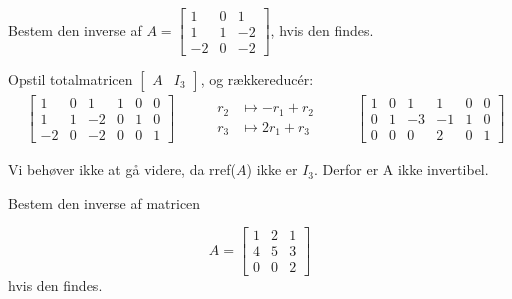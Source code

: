 \begin{example}
    Bestem den inverse af $A=\left[\begin{array}{rrr}1 & 0 & 1 \\ 1 & 1 & -2 \\ -2 & 0 & -2\end{array}\right]$, hvis den findes.
\end{example}

\begin{solution}
    Opstil totalmatricen $\left[\begin{array}{ll}A & I_3\end{array}\right]$, og rækkereducér:
\[
\begin{alignedat}{3}
& \left[\begin{array}{cccccc}
1 & 0 & 1 & 1 & 0 & 0 \\
1 & 1 & -2 & 0 & 1 & 0 \\
-2 & 0 & -2 & 0 & 0 & 1
\end{array}\right]
& \quad & \begin{aligned}
    r_2 &\mapsto -r_1 + r_2 \\
    r_3 &\mapsto 2 r_1 + r_3
\end{aligned}
& \quad & \left[\begin{array}{cccccc}
1 & 0 & 1 & 1 & 0 & 0 \\
0 & 1 & -3 & -1 & 1 & 0 \\
0 & 0 & 0 & 2 & 0 & 1
\end{array}\right]
\end{alignedat}
\]

Vi behøver ikke at gå videre, da rref($A$) ikke er $I_3$. Derfor er A ikke invertibel.
\end{solution}

\begin{example}
    Bestem den inverse af matricen

    \[
    A=\left[\begin{array}{lll}
        1 & 2 & 1 \\
        4 & 5 & 3 \\
        0 & 0 & 2
        \end{array}\right]
    \]
hvis den findes.
\end{example}

